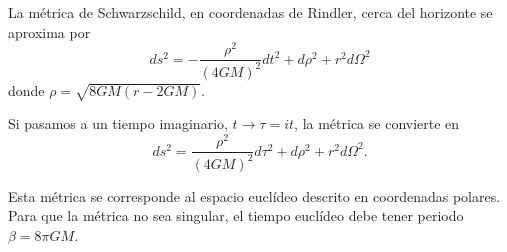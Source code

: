La métrica de Schwarzschild, en coordenadas de Rindler, cerca del horizonte se aproxima por 
\begin{equation}
  ds^2= -\frac{\rho^2}{(4GM)^2}dt^2 + d\rho^2 +r^2 d\Omega^2
\end{equation}
donde $\rho = \sqrt{8GM (r-2GM)}$.

Si pasamos a un tiempo imaginario, $t\to \tau=it$, la métrica se convierte en
\begin{equation}
  ds^2= \frac{\rho^2}{(4GM)^2}d\tau^2 + d\rho^2 +r^2 d\Omega^2.
\end{equation}

Esta métrica se corresponde al espacio euclídeo descrito en coordenadas polares.
Para que la métrica no sea singular, el tiempo euclídeo debe tener periodo $\beta=8\pi G M$.

